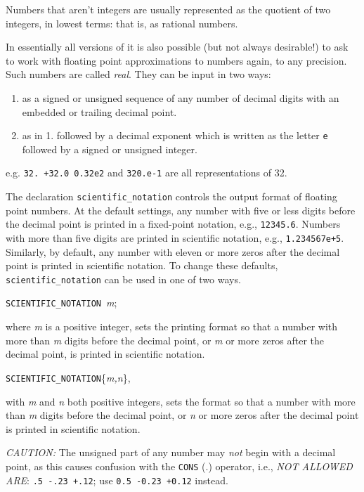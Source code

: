 Numbers that aren't integers are usually represented as the quotient of
two integers, in lowest terms: that is, as rational numbers.

In essentially all versions of {\REDUCE} it is also possible (but not always
desirable!) to ask {\REDUCE} to work with floating point approximations to
numbers again, to any precision. Such numbers are called \emph{real}.
  They can be input in two ways:
\begin{enumerate}
\item as a signed or unsigned sequence of any number of decimal digits
      with an embedded or trailing decimal point.
\item as in 1. followed by a decimal exponent which is written as the
      letter \texttt{e} followed by a signed or unsigned integer.
\end{enumerate}
e.g. \texttt{32. +32.0 0.32e2} and \texttt{320.e-1} are all representations of
32.

The declaration \texttt{scientific\_notation}
controls the output format of floating point numbers.  At
the default settings, any number with five or less digits before the
decimal point is printed in a fixed-point notation, e.g., \texttt{12345.6}.
Numbers with more than five digits are printed in scientific notation,
e.g., \texttt{1.234567e+5}.  Similarly, by default, any number with eleven or
more zeros after the decimal point is printed in scientific notation.  To
change these defaults, \texttt{scientific\_notation} can be used in one of two
ways.

\texttt{SCIENTIFIC\_NOTATION}\ \emph{m};

where \emph{m} is a positive
integer, sets the printing format so that a number with more than \emph{m}
digits before the decimal point, or \emph{m} or more zeros after the
decimal point, is printed in scientific notation.

\texttt{SCIENTIFIC\_NOTATION}\{\emph{m,n}\},

with \emph{m} and \emph{n} both positive integers, sets the
format so that a number with more than \emph{m} digits before the decimal
point, or \emph{n} or more zeros after the decimal point is printed in
scientific notation.

\textit{CAUTION:}  The unsigned part of any number may \emph{not}
begin with a decimal point, as this causes confusion with the \texttt{CONS} (.)
operator, i.e., \emph{NOT ALLOWED ARE}: \texttt{.5  -.23  +.12};
use \texttt{0.5 -0.23 +0.12} instead.

